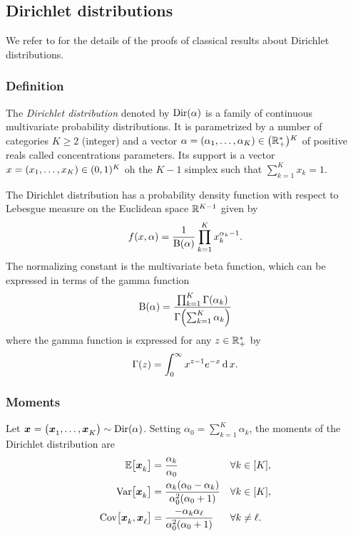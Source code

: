 \subsection{Dirichlet distributions}

We refer to \cite[Chapter 49]{Kotz2000} for the details of the proofs of classical results about Dirichlet distributions.


\subsubsection{Definition}


The \emph{Dirichlet distribution} denoted by $\operatorname{Dir}(\alpha)$ is a family of continuous multivariate probability distributions.
It is parametrized by a number of categories $K \ge 2$ (integer) and a vector $\alpha=\bracket{\alpha_1,\ldots,\alpha_K}\in\bracket{\RR_+^*}^K$ of positive reals called concentrations parameters.
Its support is a vector $x=\bracket{x_1,\ldots,x_K}\in\bracket{0,1}^K$ oh the $K-1$ simplex \ie such that $\sum_{k=1}^K x_k = 1$.

The Dirichlet distribution has a probability density function with respect to Lebesgue measure on the Euclidean space $\mathbb{R}^{K-1}$ given by
\begin{equation}\label{eq:dirchlet:probability-density-function}
  f\bracket{x,\alpha} = \frac{1}{ \Beta\bracket{\alpha}}\prod_{k=1}^K x_k^{\alpha_k-1}.
\end{equation}
The normalizing constant is the multivariate beta function, which can be expressed in terms of the gamma function
\begin{equation}
  \Beta\bracket{\alpha} =
  \frac{ \prod_{k=1}^K \Gamma\bracket{\alpha_k} }
       { \Gamma\bracket{\sum_{k=1}^K \alpha_k} }
\end{equation}
where the gamma function is expressed for any $z\in\mathbb{R}_+^*$ by
\begin{equation}
  \Gamma\bracket{z} = \int_0^{\infty} x^{z-1}e^{-x} \diff x.
\end{equation}


\subsubsection{Moments}


Let $\va x=\bracket{\va x_1,\ldots,\va x_K}\sim \Dir\bracket{\alpha}$.
Setting $\alpha_0=\sum_{k=1}^K\alpha_k$, the moments of the Dirichlet distribution are
\begin{subequations}\label{eq:dirchlet:moments}
  \begin{align}
    \espe\sqbracket{\va x_k} &= \frac{\alpha_k}{\alpha_0} && \forall k\in\range{K},
    \label{eq:dirchlet:moments:mean}
    \\
    \vari\sqbracket{\va x_k} &= \frac{\alpha_k\bracket{\alpha_0-\alpha_k}}{\alpha_0^2\bracket{\alpha_0+1}} && \forall k\in\range{K},
    \label{eq:dirchlet:moments:mean}
    \\
    \cova\sqbracket{\va x_k,\va x_{\ell}} &= \frac{-\alpha_k\alpha_{\ell}}{\alpha_0^2\bracket{\alpha_0+1}} && \forall k\ne\ell.
    \label{eq:dirchlet:moments:mean}
  \end{align}
\end{subequations}


